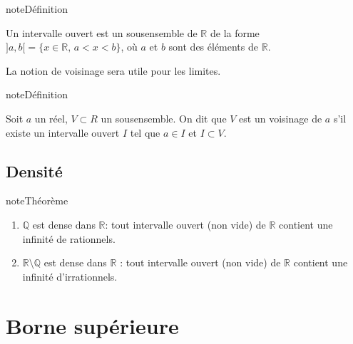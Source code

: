 \documentclass[letterpaper,10pt,french]{jupyterBook}
\begin{document}
\begin{sphinxadmonition}{note}{Définition}

\sphinxAtStartPar
Un intervalle ouvert est un sous\sphinxhyphen{}ensemble de \(\mathbb{R}\) de la forme \(]a,b[= \{x\in \mathbb{R},\,a<x<b\}\), où \(a\) et \(b\) sont des éléments de \(\mathbb{R}.\)
\end{sphinxadmonition}

\sphinxAtStartPar
La notion de voisinage sera utile pour les limites.

\begin{sphinxadmonition}{note}{Définition}

\sphinxAtStartPar
Soit \(a\) un réel, \(V\subset R\) un sous\sphinxhyphen{}ensemble. On dit que \(V\) est un voisinage de \(a\) s’il existe un intervalle ouvert \(I\) tel que \(a \in I\) et \(I \subset V.\)
\end{sphinxadmonition}


\subsection{Densité}
\label{\detokenize{proprties:densite}}
\begin{sphinxadmonition}{note}{Théorème}
\begin{enumerate}
%
\item {} 
\sphinxAtStartPar
\(\mathbb{Q}\) est dense dans \(\mathbb{R}\): tout intervalle ouvert (non vide) de \(\mathbb{R}\) contient une infinité de rationnels.

\item {} 
\sphinxAtStartPar
\(\mathbb{R}\setminus \mathbb{Q}\) est dense dans \(\mathbb{R}\) : tout intervalle ouvert (non vide) de \(\mathbb{R}\) contient une infinité d’irrationnels.

\end{enumerate}
\end{sphinxadmonition}


\section{Borne supérieure}
\label{\detokenize{proprties:borne-superieure}}
\end{document}

